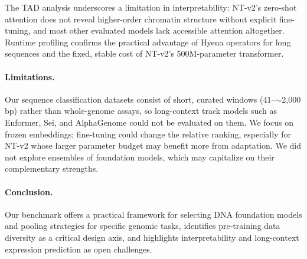 \documentclass[11pt,a4paper]{article}
\begin{document}
The TAD analysis underscores a limitation in interpretability: NT-v2's zero-shot attention does not reveal higher-order chromatin structure without explicit fine-tuning, and most other evaluated models lack accessible attention altogether. Runtime profiling confirms the practical advantage of Hyena operators for long sequences and the fixed, stable cost of NT-v2's 500M-parameter transformer.

\paragraph{Limitations.} Our sequence classification datasets consist of short, curated windows (41--$\sim$2{,}000 bp) rather than whole-genome assays, so long-context track models such as Enformer, Sei, and AlphaGenome could not be evaluated on them. We focus on frozen embeddings; fine-tuning could change the relative ranking, especially for NT-v2 whose larger parameter budget may benefit more from adaptation. We did not explore ensembles of foundation models, which may capitalize on their complementary strengths.

\paragraph{Conclusion.} Our benchmark offers a practical framework for selecting DNA foundation models and pooling strategies for specific genomic tasks, identifies pre-training data diversity as a critical design axis, and highlights interpretability and long-context expression prediction as open challenges.



\end{document}
